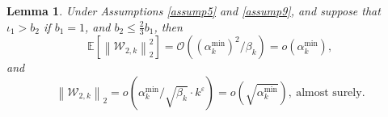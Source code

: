 \documentclass[aos]{imsart}
\numberwithin{equation}{section}
\theoremstyle{plain}
\newtheorem{lemma}{Lemma}
\begin{document}
\begin{appendix}
\begin{lemma}
Under Assumptions \ref{assump5} and  \ref{assump9}, and suppose that $\iota_1>b_2$ if $b_1=1$, and $b_2 \leq \frac{2}{3}b_1$, then
    \begin{equation*}
        \mathbb{E} \left[ \left\|\mathcal{W}_{2,k} \right\|_2^2 \right] = \mathcal{O} \left( (\alpha^{\min}_k)^2 / \beta_k \right) = o\left( \alpha^{\min}_k \right),
    \end{equation*}
    and
    \begin{equation*}
        \left\|\mathcal{W}_{2,k} \right\|_2 = o\left( \alpha^{\min}_k / \sqrt{\beta_k} \cdot k^{\varepsilon}  \right) = o\left(\sqrt{\alpha^{\min}_k} \right),~\text{almost surely}.
    \end{equation*}
\end{lemma}



\end{appendix}
\end{document}
